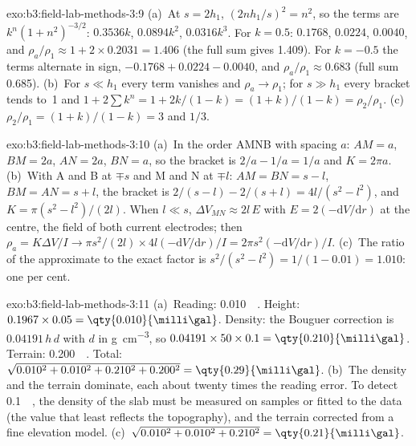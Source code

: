 \begin{solution}{exo:b3:field-lab-methods-3:9}
(a)~At $s = 2h_1$, $(2nh_1/s)^2 = n^2$, so the terms are $k^n(1 +
n^2)^{-3/2}$: $0.3536k$, $0.0894k^2$, $0.0316k^3$. For $k = 0.5$:
$\num{0.1768}$, $\num{0.0224}$, $\num{0.0040}$, and $\rho_a/\rho_1 \approx
1 + 2\times0.2031 = \num{1.406}$ (the full sum gives \num{1.409}). For $k
= -0.5$ the terms alternate in sign, $-0.1768 + 0.0224 - 0.0040$, and
$\rho_a/\rho_1 \approx \num{0.683}$ (full sum \num{0.685}). (b)~For $s \ll
h_1$ every term vanishes and $\rho_a \to \rho_1$; for $s \gg h_1$ every
bracket tends to~1 and $1 + 2\sum k^n = 1 + 2k/(1 - k) = (1 + k)/(1 -
k) = \rho_2/\rho_1$. (c)~$\rho_2/\rho_1 = (1 + k)/(1 - k) = 3$ and $1/3$.
\end{solution}

\begin{solution}{exo:b3:field-lab-methods-3:10}
(a)~In the order AMNB with spacing $a$: $AM = a$, $BM = 2a$, $AN = 2a$,
$BN = a$, so the bracket is $2/a - 1/a = 1/a$ and $K = 2\pi a$.
(b)~With A and B at $\mp s$ and M and N at $\mp l$: $AM = BN = s - l$,
$BM = AN = s + l$, the bracket is $2/(s - l) - 2/(s + l) = 4l/(s^2 -
l^2)$, and $K = \pi(s^2 - l^2)/(2l)$. When $l \ll s$, $\Delta V_{MN}
\approx 2l\,E$ with $E = 2(-\mathrm{d}V/\mathrm{d}r)$ at the centre, the
field of both current electrodes; then $\rho_a = K\Delta V/I \to
\pi s^2/(2l)\times 4l(-\mathrm{d}V/\mathrm{d}r)/I = 2\pi s^2(-
\mathrm{d}V/\mathrm{d}r)/I$. (c)~The ratio of the approximate to the
exact factor is $s^2/(s^2 - l^2) = 1/(1 - 0.01) = 1.010$: one per cent.
\end{solution}

\begin{solution}{exo:b3:field-lab-methods-3:11}
(a)~Reading: \qty{0.010}{\milli\gal}. Height:
$0.1967\times0.05 = \qty{0.010}{\milli\gal}$. Density: the Bouguer
correction is $0.04191\,h\,d$ with $d$ in \unit{g.cm^{-3}}, so
$0.04191\times50\times0.1 = \qty{0.210}{\milli\gal}$. Terrain:
\qty{0.200}{\milli\gal}. Total: $\sqrt{0.010^2 + 0.010^2 + 0.210^2 +
0.200^2} = \qty{0.29}{\milli\gal}$. (b)~The density and the terrain
dominate, each about twenty times the reading error. To detect
\qty{0.1}{\milli\gal}, the density of the slab must be measured on
samples or fitted to the data (the value that least reflects the
topography), and the terrain corrected from a fine elevation model.
(c)~$\sqrt{0.010^2 + 0.010^2 + 0.210^2} = \qty{0.21}{\milli\gal}$.
\end{solution}

